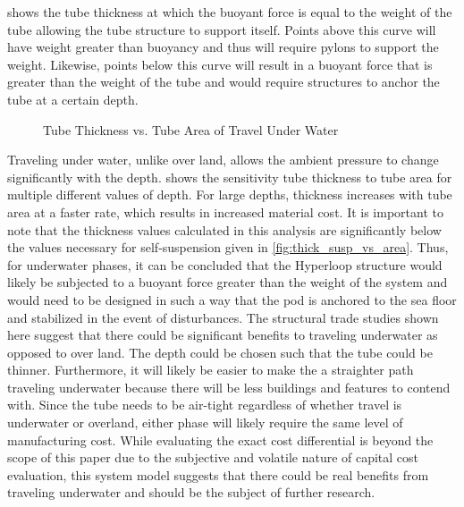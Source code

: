  shows the tube thickness at which the buoyant force is equal to the weight of the tube allowing the tube structure to support itself. Points above this curve will have weight greater than buoyancy and thus will require pylons to support the weight. Likewise, points below this curve will result in a buoyant force that is greater than the weight of the tube and would require structures to anchor the tube at a certain depth.

\begin{figure}
	\centering
	\caption{Tube Thickness vs. Tube Area of Travel Under Water}
	\label{fig:tube_thick_vs_tube_area_underwater}
\end{figure}

Traveling under water, unlike over land, allows the ambient pressure to change significantly with the depth.  shows the sensitivity tube thickness to tube area for multiple different values of depth. For large depths, thickness increases with tube area at a faster rate, which results in increased material cost. It is important to note that the thickness values calculated in this analysis are significantly below the values necessary for self-suspension given in \cref{fig:thick_susp_vs_area}. Thus, for underwater phases, it can be concluded that the Hyperloop structure would likely be subjected to a buoyant force greater than the weight of the system and would need to be designed in such a way that the pod is anchored to the sea floor and stabilized in the event of disturbances.
The structural trade studies shown here suggest that there could be significant benefits to traveling underwater as opposed to over land. The depth could be chosen such that the tube could be thinner. Furthermore, it will likely be easier to make the a straighter path traveling underwater because there will be less buildings and features to contend with. Since the tube needs to be air-tight regardless of whether travel is underwater or overland, either phase will likely require the same level of manufacturing cost. While evaluating the exact cost differential is beyond the scope of this paper due to the subjective and volatile nature of capital cost evaluation, this system model suggests that there could be real benefits from traveling underwater and should be the subject of further research.

